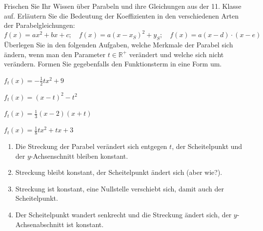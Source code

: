 \documentclass[12pt,a4paper,twoside,fleqn]{article}
\begin{document}
\begin{question}

  Frischen Sie Ihr Wissen über Parabeln und ihre Gleichungen aus der
  11. Klasse auf. Erläutern Sie die Bedeutung der Koeffizienten in den
  verschiedenen Arten der Parabelgleichungen:
  $$f(x)=ax^2+bx+c;\quad f(x)=a(x-x_S)^2 + y_S;\quad
  f(x)=a(x-d)\cdot(x-e)$$
  Überlegen Sie in den folgenden Aufgaben, welche Merkmale der Parabel
  sich ändern, wenn man den Parameter $t\in\mathbb{R}^+$ verändert und
  welche sich 
  nicht verändern. Formen Sie gegebenfalls den Funktionsterm in eine
  Form um.
  \begin{enumerate}
    \begin{multicols}{2}
    \item $f_t(x)=-\frac 1 2 tx^2+9$
    \item $f_t(x)=(x-t)^2-t^2$
    \item $f_t(x)=\frac 1 3 (x-2)(x+t)$
    \item $f_t(x)=\frac 1 8 t x^2+tx+3$
    \end{multicols}
\end{enumerate}
\end{question}
\begin{solution}
   \begin{enumerate}
      \item Die Streckung der Parabel verändert sich entgegen $t$, der
      Scheitelpunkt und der $y$-Achsenschnitt bleiben konstant.
    \item Streckung bleibt konstant, der Scheitelpunkt ändert sich
      (aber wie?).
    \item Streckung ist konstant, eine Nullstelle verschiebt sich,
      damit auch der Scheitelpunkt.
    \item Der Scheitelpunkt wandert senkrecht  und die Streckung
      ändert sich, der $y$-Achsenabschnitt ist konstant.
  \end{enumerate}
\end{solution}
\end{document}
